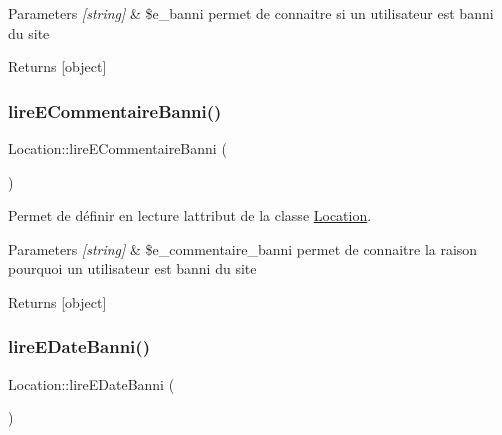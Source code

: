 \begin{DoxyParams}{Parameters}
{\em \mbox{[}string\mbox{]}} & \$e\+\_\+banni permet de connaitre si un utilisateur est banni du site \\
\hline
\end{DoxyParams}
\begin{DoxyReturn}{Returns}
\mbox{[}object\mbox{]} 
\end{DoxyReturn}
\mbox{\label{class_location_a68be2be4f2d8da83b9d304a9132fc5b5}} 
\subsubsection{\texorpdfstring{lire\+E\+Commentaire\+Banni()}{lireECommentaireBanni()}}
{\footnotesize\ttfamily Location\+::lire\+E\+Commentaire\+Banni (\begin{DoxyParamCaption}{ }\end{DoxyParamCaption})}



Permet de définir en lecture l\textquotesingle{}attribut de la classe \hyperlink{class_location}{Location}. 


\begin{DoxyParams}{Parameters}
{\em \mbox{[}string\mbox{]}} & \$e\+\_\+commentaire\+\_\+banni permet de connaitre la raison pourquoi un utilisateur est banni du site \\
\hline
\end{DoxyParams}
\begin{DoxyReturn}{Returns}
\mbox{[}object\mbox{]} 
\end{DoxyReturn}
\mbox{\label{class_location_ac1331928786ec756180787ab12779b0b}} 
\subsubsection{\texorpdfstring{lire\+E\+Date\+Banni()}{lireEDateBanni()}}
{\footnotesize\ttfamily Location\+::lire\+E\+Date\+Banni (\begin{DoxyParamCaption}{ }\end{DoxyParamCaption})}



